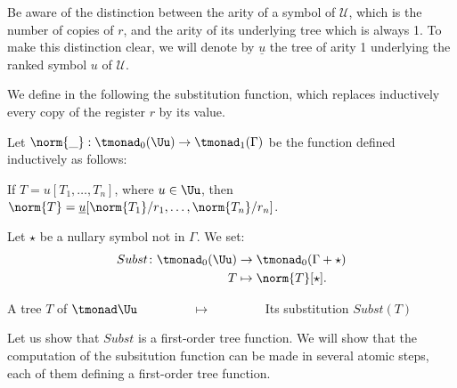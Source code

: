 Be aware of the distinction between the arity of a symbol of $\mathcal{U}$, which is the number of copies of $r$, and the arity of its underlying tree which is always 1. To make this distinction clear, we will denote by $\underline{u}$ the tree of arity 1 underlying the ranked symbol $u$ of $\mathcal{U}$. 

We define in the following the substitution function, which replaces inductively every copy of the register $r$ by its value.
\begin{definition}
Let $\norm{\_}:\tmonad_0(\Uu)\to \tmonad_1(\Gamma)$ be the function defined inductively as follows:

If $T=u[T_1,\dots,T_n]$, where $u\in\Uu$, then $\norm{T}=\underline{u}[\norm{T_1}/r_1,\dots,\norm{T_n}/r_n]$. 


\noindent Let $\star$ be a nullary symbol not in $\Gamma$. We set: 
\begin{align*}
  Subst \colon\tmonad_0(\Uu) &\to \tmonad_0(\Gamma+\star)\\
  T &\mapsto \norm{T}[\star].
\end{align*} 
\end{definition}

\begin{example}
\begin{center}
A tree $T$ of $\tmonad \Uu$ $\qquad\qquad\mapsto\qquad\qquad$ Its substitution $Subst(T)$ 
\end{center}
\end{example}

Let us show that $Subst$ is a first-order tree function. We will show that the computation of the subsitution function can be made in several atomic steps, each of them defining a first-order tree function.
 
